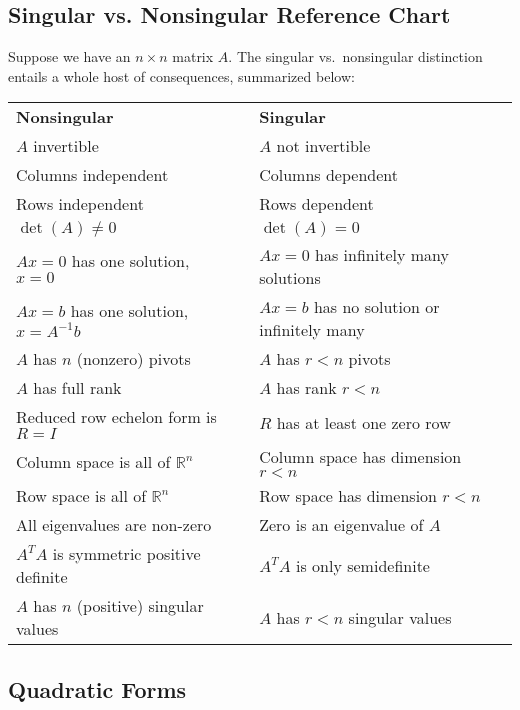 \documentclass[12pt]{book}
\numberwithin{equation}{section} %
\theoremstyle{plain}
\theoremstyle{definition}
\theoremstyle{remark}
\begin{document}
\subsection{Singular vs. Nonsingular Reference Chart}

Suppose we have an $n\times n$ matrix $A$. The singular vs.\ nonsingular
distinction entails a whole host of consequences, summarized below:
\begin{table}[h!]
\centering
\begin{tabular}{lll}
\textbf{Nonsingular}                     && \textbf{Singular} \\
$A$ invertible                           && $A$ not invertible \\
Columns independent                      && Columns dependent \\
Rows independent                         && Rows dependent \\
$\det(A)\neq0$                           && $\det(A)=0$ \\
$Ax = 0$ has one solution, $x = 0$       && $Ax=0$ has infinitely many solutions\\
$Ax = b$ has one solution, $x = A^{-1}b$ && $Ax = b$ has no solution or infinitely many \\
$A$ has $n$ (nonzero) pivots             && $A$ has $r<n$ pivots \\
$A$ has full rank                        && $A$ has rank $r<n$ \\
Reduced row echelon form is $R = I$      && $R$ has at least one zero row \\
Column space is all of $\mathbb{R}^n$    && Column space has dimension $r<n$ \\
Row space is all of $\mathbb{R}^n$       && Row space has dimension $r<n$ \\
All eigenvalues are non-zero             && Zero is an eigenvalue of $A$ \\
$A^T A$ is symmetric positive definite   && $A^T A$ is only semidefinite \\
$A$ has $n$ (positive) singular values   && $A$ has $r<n$ singular values
\end{tabular}
\end{table}







\clearpage
\subsection{Quadratic Forms}
\end{document}
